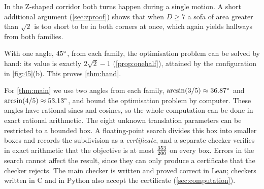 In the Z-shaped corridor both turns happen during a single motion. A short additional argument (\cref{sec:zproof}) shows that when $D\ge7$ a sofa of area greater than $\sqrt2$ is too short to be in both corners at once, which again yields hallways from both families.

With one angle, $45^{\circ}$, from each family, the optimisation problem can be solved by hand: its value is exactly $2\sqrt2-1$ (\cref{prop:onehalf}), attained by the configuration in \cref{fig:45}(b). This proves \cref{thm:hand}.

For \cref{thm:main} we use two angles from each family, $\arcsin(3/5)\approx 36.87^{\circ}$ and $\arcsin(4/5)\approx 53.13^{\circ}$, and bound the optimisation problem by computer. These angles have rational sines and cosines, so the whole computation can be done in exact rational arithmetic. The eight unknown translation parameters can be restricted to a bounded box. A floating-point search divides this box into smaller boxes and records the subdivision as a \emph{certificate}, and a separate checker verifies in exact arithmetic that the objective is at most $\tfrac{353}{200}$ on every box. Errors in the search cannot affect the result, since they can only produce a certificate that the checker rejects. The main checker is written and proved correct in Lean; checkers written in C and in Python also accept the certificate (\cref{sec:computation}).
